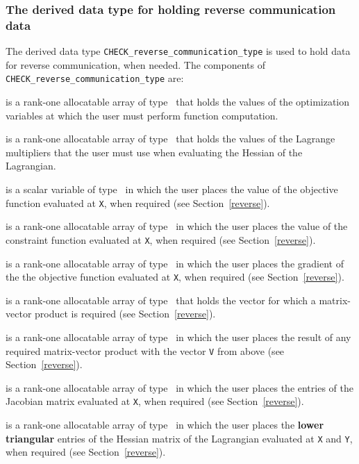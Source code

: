 \documentclass{galahad}
\newcommand{\packagename}{CHECK}
\begin{document}

\subsubsection{The derived data type for holding reverse communication data}\label{typerc}
The derived data type {\tt \packagename\_reverse\_communication\_type}
is used to hold data for reverse communication, when needed. The components of 
{\tt \packagename\_reverse\_communication\_type} are:

\begin{description}

 is a rank-one allocatable array of type \realdp\ that
holds the values of the optimization variables at which the user must
perform function computation.

 is a rank-one allocatable array of type \realdp\ that
holds the values of the Lagrange multipliers that the user must use
when evaluating the Hessian of the Lagrangian.

 is a scalar variable of type \realdp\ in which the
user places the value of the objective function evaluated at {\tt X},
when required (see Section~\ref{reverse}).

 is a rank-one allocatable array of type \realdp\ in
which the user places the value of the constraint function evaluated
at {\tt X}, when required (see Section~\ref{reverse}).

 is a rank-one allocatable array of type \realdp\ in
which the user places the gradient of the the objective function
evaluated at {\tt X}, when required (see Section~\ref{reverse}).

 is a rank-one allocatable array of type \realdp\ that
holds the vector for which a matrix-vector product is required (see
Section~\ref{reverse}).

 is a rank-one allocatable array of type \realdp\ in
which the user places the result of any required matrix-vector product
with the vector {\tt V} from above (see Section~\ref{reverse}). 

 is a rank-one allocatable array of type \realdp\ in
which the user places the entries of the Jacobian matrix evaluated at
{\tt X}, when required (see Section~\ref{reverse}). 

 is a rank-one allocatable array of type \realdp\ in
which the user places the {\bf lower triangular} entries of the Hessian matrix of the
Lagrangian evaluated at
{\tt X} and {\tt Y}, when required (see Section~\ref{reverse}). 

\end{description}
\end{document}
